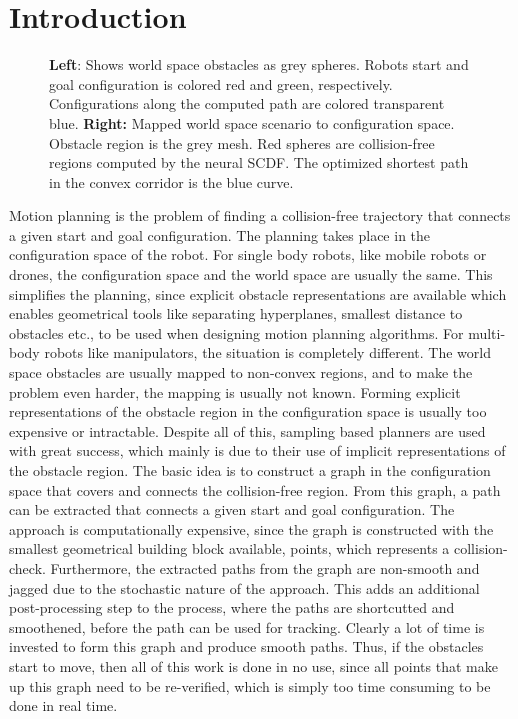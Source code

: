 \documentclass[../main.tex]{subfiles}
\begin{document}
\section{Introduction}
\begin{figure}
\centering
{}
\vspace{-5pt}
\label{fig:pbrm_intro}
\caption{\textbf{Left}: Shows world space obstacles as grey spheres. Robots start and goal configuration is colored red and green, respectively. Configurations along the computed path are colored transparent blue. \textbf{Right:} Mapped world space scenario to configuration space. Obstacle region is the grey mesh. Red spheres are collision-free regions computed by the neural SCDF. The optimized shortest path in the convex corridor is the blue curve.}
\vspace{-25pt}
\end{figure}
Motion planning is the problem of finding a collision-free trajectory that connects a given start and goal configuration. The planning takes place in the configuration space of the robot. For single body robots, like mobile robots or drones, the configuration space and the world space are usually the same. This simplifies the planning, since explicit obstacle representations are available which enables geometrical tools like separating hyperplanes, smallest distance to obstacles etc., to be used when designing motion planning algorithms. For multi-body robots like manipulators, the situation is completely different. The world space obstacles are usually mapped to non-convex regions, and to make the problem even harder, the mapping is usually not known. Forming explicit representations of the obstacle region in the configuration space is usually too expensive or intractable. Despite all of this, sampling based planners are used with great success, which mainly is due to their use of implicit representations of the obstacle region. The basic idea is to construct a graph in the configuration space that covers and connects the collision-free region. From this graph, a path can be extracted that connects a given start and goal configuration. The approach is computationally expensive, since the graph is constructed with the smallest geometrical building block available, points, which represents a collision-check. Furthermore, the extracted paths from the graph are non-smooth and jagged due to the stochastic nature of the approach. This adds an additional post-processing step to the process, where the paths are shortcutted and smoothened, before the path can be used for tracking. Clearly a lot of time is invested to form this graph and produce smooth paths. Thus, if the obstacles start to move, then all of this work is done in no use, since all points that make up this graph need to be re-verified, which is simply too time consuming to be done in real time.
\end{document}
